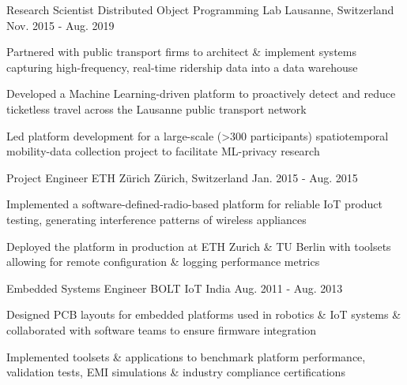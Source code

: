 \begin{cventries}
  \cventry
    {Research Scientist} %
    {Distributed Object Programming Lab} %
    {Lausanne, Switzerland} %
    {Nov. 2015 - Aug. 2019} %
    {
      \begin{cvitems} %
      	\item {Partnered with public transport firms to architect \& implement systems capturing high-frequency, real-time ridership data into a data warehouse}
      	\item {Developed a Machine Learning-driven platform to proactively detect and reduce ticketless travel across the Lausanne public transport network}
        \item {Led platform development for a large-scale (>300 participants) spatiotemporal mobility-data collection project to facilitate ML-privacy research}
      \end{cvitems}
    }

	\vspace{-0.1cm}

  \cventry
    {Project Engineer} %
    {ETH Zürich} %
    {Zürich, Switzerland} %
    {Jan. 2015 - Aug. 2015} %
    {
      \begin{cvitems} %
      	\item {Implemented a software-defined-radio-based platform for reliable IoT product testing, generating interference patterns of wireless appliances}
        \item {Deployed the platform in production at ETH Zurich \& TU Berlin with toolsets allowing for remote configuration \& logging performance metrics}
      \end{cvitems}
    }
    
  \vspace{-0.1cm}

  \cventry
    {Embedded Systems Engineer} %
    {BOLT IoT} %
    {India} %
    {Aug. 2011 - Aug. 2013} %
    {
      \begin{cvitems} %
      	\item {Designed PCB layouts for embedded platforms used in robotics \& IoT systems \& collaborated with software teams to ensure firmware integration}
        \item {Implemented toolsets \& applications to benchmark platform performance, validation tests, EMI simulations \& industry compliance certifications}
      \end{cvitems}
    }
    
    \vspace{-0.4cm}

\end{cventries}
